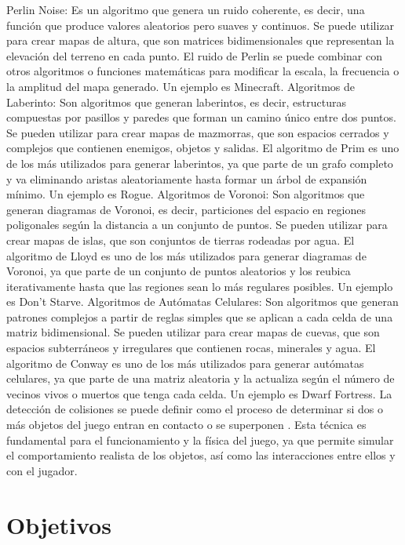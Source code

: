 \documentclass[stu, 12pt, letterpaper, donotrepeattitle, floatsintext, natbib]{apa7}
\begin{document}
Perlin Noise: Es un algoritmo que genera un ruido coherente, es decir, una función que produce valores aleatorios pero suaves y continuos. Se puede utilizar para crear mapas de altura, que son matrices bidimensionales que representan la elevación del terreno en cada punto. El ruido de Perlin se puede combinar con otros algoritmos o funciones matemáticas para modificar la escala, la frecuencia o la amplitud del mapa generado. Un ejemplo es Minecraft.
Algoritmos de Laberinto: Son algoritmos que generan laberintos, es decir, estructuras compuestas por pasillos y paredes que forman un camino único entre dos puntos. Se pueden utilizar para crear mapas de mazmorras, que son espacios cerrados y complejos que contienen enemigos, objetos y salidas. El algoritmo de Prim es uno de los más utilizados para generar laberintos, ya que parte de un grafo completo y va eliminando aristas aleatoriamente hasta formar un árbol de expansión mínimo. Un ejemplo es Rogue.
Algoritmos de Voronoi: Son algoritmos que generan diagramas de Voronoi, es decir, particiones del espacio en regiones poligonales según la distancia a un conjunto de puntos. Se pueden utilizar para crear mapas de islas, que son conjuntos de tierras rodeadas por agua. El algoritmo de Lloyd es uno de los más utilizados para generar diagramas de Voronoi, ya que parte de un conjunto de puntos aleatorios y los reubica iterativamente hasta que las regiones sean lo más regulares posibles. Un ejemplo es Don’t Starve.
Algoritmos de Autómatas Celulares: Son algoritmos que generan patrones complejos a partir de reglas simples que se aplican a cada celda de una matriz bidimensional. Se pueden utilizar para crear mapas de cuevas, que son espacios subterráneos y irregulares que contienen rocas, minerales y agua. El algoritmo de Conway es uno de los más utilizados para generar autómatas celulares, ya que parte de una matriz aleatoria y la actualiza según el número de vecinos vivos o muertos que tenga cada celda. Un ejemplo es Dwarf Fortress.
La detección de colisiones se puede definir como el proceso de determinar si dos o más objetos del juego entran en contacto o se superponen \noindent{}. Esta técnica es fundamental para el funcionamiento y la física del juego, ya que permite simular el comportamiento realista de los objetos, así como las interacciones entre ellos y con el jugador.

\section{\large Objetivos}
\end{document}
